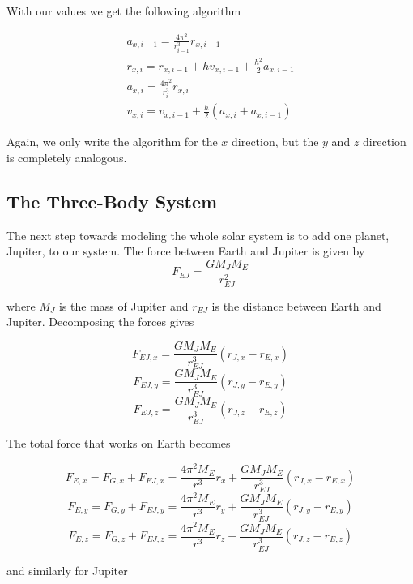\documentclass{article}
\begin{document}
With our values we get the following algorithm

\begin{equation*}
\begin{split}
a_{x,i-1}=\frac{4\pi^2}{r_{i-1}^3}r_{x,i-1}\\
r_{x,i}=r_{x,i-1}+hv_{x,i-1}+\frac{h^2}{2}a_{x,i-1}\\
a_{x,i}=\frac{4\pi^2}{r_i^3}r_{x,i}\\
v_{x,i}=v_{x,i-1}+\frac{h}{2}(a_{x,i}+a_{x,i-1})
\end{split}
\end{equation*}

\vskip0.5cm
\begin{algorithm}[H]
\end{algorithm}
\vskip0.5cm


Again, we only write the algorithm for the $x$ direction, but the $y$ and $z$ direction is completely analogous.


\subsection{The Three-Body System}

The next step towards modeling the whole solar system is to add one planet, Jupiter, to our system. The force between Earth and Jupiter is given by
$$F_{EJ}=\frac{GM_JM_E}{r_{EJ}^2}$$

where $M_J$ is the mass of Jupiter and $r_{EJ}$ is the distance between Earth and Jupiter. Decomposing the forces gives

$$F_{EJ,x}=\frac{GM_JM_E}{r_{EJ}^3}(r_{J,x}-r_{E,x})$$
$$F_{EJ,y}=\frac{GM_JM_E}{r_{EJ}^3}(r_{J,y}-r_{E,y})$$
$$F_{EJ,z}=\frac{GM_JM_E}{r_{EJ}^3}(r_{J,z}-r_{E,z})$$

The total force that works on Earth becomes

$$F_{E,x}=F_{G,x}+F_{EJ,x}=\frac{4\pi^2M_E}{r^3}r_x+\frac{GM_JM_E}{r_{EJ}^3}(r_{J,x}-r_{E,x})$$
$$F_{E,y}=F_{G,y}+F_{EJ,y}=\frac{4\pi^2M_E}{r^3}r_y+\frac{GM_JM_E}{r_{EJ}^3}(r_{J,y}-r_{E,y})$$
$$F_{E,z}=F_{G,z}+F_{EJ,z}=\frac{4\pi^2M_E}{r^3}r_z+\frac{GM_JM_E}{r_{EJ}^3}(r_{J,z}-r_{E,z})$$

and similarly for Jupiter
\end{document}
